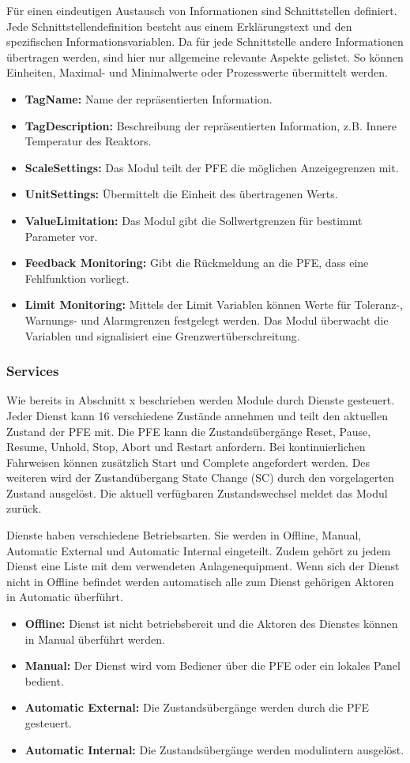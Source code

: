 Für einen eindeutigen Austausch von Informationen sind Schnittstellen definiert. Jede Schnittstellendefinition besteht aus einem Erklärungstext und den spezifischen Informationsvariablen. Da für jede Schnittstelle andere Informationen übertragen werden, sind hier nur allgemeine relevante Aspekte gelistet. So können Einheiten, Maximal- und Minimalwerte oder Prozesswerte übermittelt werden.
\begin{itemize}
\item \textbf{TagName:} Name der repräsentierten Information. 
\item \textbf{TagDescription:} Beschreibung der repräsentierten Information, z.B. Innere Temperatur des Reaktors.
\item \textbf{ScaleSettings:} Das Modul teilt der PFE die möglichen Anzeigegrenzen mit.
\item \textbf{UnitSettings:} Übermittelt die Einheit des übertragenen Werts.
\item \textbf{ValueLimitation:} Das Modul gibt die Sollwertgrenzen für bestimmt Parameter vor.
\item \textbf{Feedback Monitoring:} Gibt die Rückmeldung an die PFE, dass eine Fehlfunktion vorliegt.
\item \textbf{Limit Monitoring:} Mittels der Limit Variablen können Werte für Toleranz-, Warnungs- und Alarmgrenzen festgelegt werden. Das Modul überwacht die Variablen und signalisiert eine Grenzwertüberschreitung.
\end{itemize}

\subsubsection{Services}
Wie bereits in Abschnitt x beschrieben werden Module durch Dienste gesteuert. Jeder Dienst kann 16 verschiedene Zustände annehmen und teilt den aktuellen Zustand der PFE mit. Die PFE kann die Zustandsübergänge Reset, Pause, Resume, Unhold, Stop, Abort und Restart anfordern. Bei kontinuierlichen Fahrweisen können zusätzlich Start und Complete angefordert werden. Des weiteren wird der Zustandübergang State Change (SC) durch den vorgelagerten Zustand ausgelöst.  Die aktuell verfügbaren Zustandswechsel meldet das Modul zurück.

Dienste haben verschiedene Betriebsarten. Sie werden in Offline, Manual, Automatic External und Automatic Internal eingeteilt. Zudem gehört zu jedem Dienst eine Liste mit dem verwendeten Anlagenequipment. Wenn sich der Dienst nicht in Offline befindet werden automatisch alle zum Dienst gehörigen Aktoren in Automatic überführt.
\begin{itemize}
\item \textbf{Offline:} Dienst ist nicht betriebsbereit und die Aktoren des Dienstes können in Manual überführt werden.
\item \textbf{Manual:} Der Dienst wird vom Bediener über die PFE oder ein lokales Panel bedient.
\item \textbf{Automatic External:} Die Zustandsübergänge werden durch die PFE gesteuert.
\item \textbf{Automatic Internal:} Die Zustandsübergänge werden modulintern ausgelöst.
\end{itemize}


